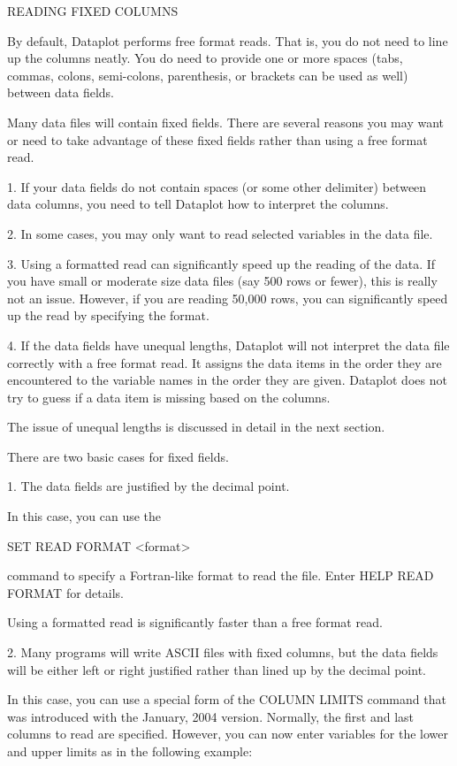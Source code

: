 READING FIXED COLUMNS

By default, Dataplot performs free format reads.  That is,
you do not need to line up the columns neatly.  You do need
to provide one or more spaces (tabs, commas, colons, semi-colons,
parenthesis, or brackets can be used as well) between data fields.

Many data files will contain fixed fields.  There are several reasons
you may want or need to take advantage of these fixed fields rather
than using a free format read.

   1. If your data fields do not contain spaces (or some other
      delimiter) between data columns, you need to tell
      Dataplot how to interpret the columns.

   2. In some cases, you may only want to read selected
      variables in the data file.

   3. Using a formatted read can significantly speed up the reading
      of the data.  If you have small or moderate size data files (say
      500 rows or fewer), this is really not an issue.  However, if you
      are reading 50,000 rows, you can significantly speed up the read
      by specifying the format.

   4. If the data fields have unequal lengths, Dataplot will not
      interpret the data file correctly with a free format read.
      It assigns the data items in the order they are encountered
      to the variable names in the order they are given.  Dataplot
      does not try to guess if a data item is missing based on the
      columns.

      The issue of unequal lengths is discussed in detail in the
      next section.

There are two basic cases for fixed fields.

   1. The data fields are justified by the decimal point.

      In this case, you can use the 

          SET READ FORMAT  <format>

      command to specify a Fortran-like format to read the file.
      Enter HELP READ FORMAT for details.

      Using a formatted read is significantly faster than a
      free format read.

   2. Many programs will write ASCII files with fixed columns,
      but the data fields will be either left or right justified
      rather than lined up by the decimal point.

      In this case, you can use a special form of the
      COLUMN LIMITS command that was introduced with the
      January, 2004 version.  Normally, the first and last columns
      to read are specified.  However, you can now enter variables for
      the lower and upper limits as in the following example:

